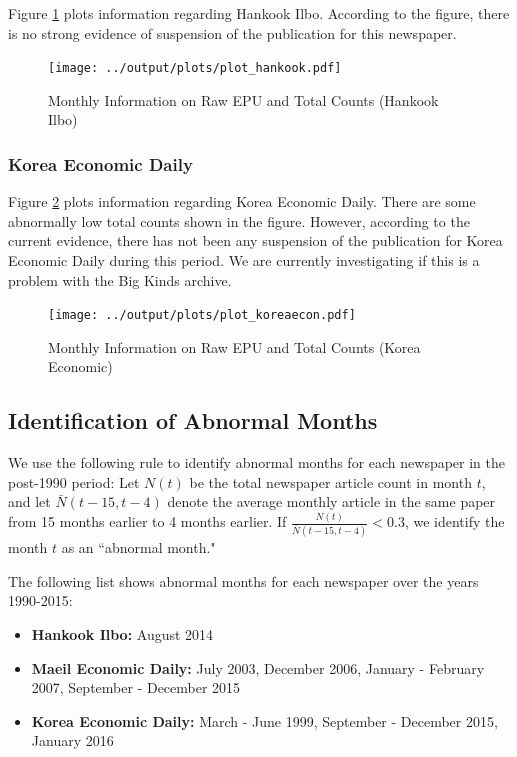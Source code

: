 Figure \ref{fig:hankook} plots information regarding Hankook Ilbo. According to the figure, there is no strong evidence of suspension of the publication for this newspaper. 

\begin{landscape}
\begin{figure}[H] \caption{Monthly Information on Raw EPU and Total Counts (Hankook Ilbo)} \label{fig:hankook}
\begin{center}
\texttt{[image: ../output/plots/plot\_hankook.pdf]} 
\end{center}
\end{figure}
\end{landscape}


\subsubsection{Korea Economic Daily}

Figure \ref{fig:koreaecon} plots information regarding Korea Economic Daily. There are some abnormally low total counts shown in the figure. However, according to the current evidence, there has not been any suspension of the publication for Korea Economic Daily during this period. We are currently investigating if this is a problem with the Big Kinds archive. 

\begin{landscape}
\begin{figure}[H] \caption{Monthly Information on Raw EPU and Total Counts (Korea Economic)} \label{fig:koreaecon}
\begin{center}
\texttt{[image: ../output/plots/plot\_koreaecon.pdf]} 
\end{center}
\end{figure}
\end{landscape}

\subsection{Identification of Abnormal Months} \label{subsec:abnormal}

We use the following rule to identify abnormal months for each newspaper in the post-1990 period: Let $N(t)$ be the total newspaper article count in month $t$, and let $\bar{N}(t-15, t-4)$ denote the average monthly article in the same paper from 15 months earlier to 4 months earlier. If $\frac{N(t)}{\bar{N}(t-15,t-4)} < 0.3$, we identify the month $t$ as an ``abnormal month." 

The following list shows abnormal months for each newspaper over the years 1990-2015:
\begin{itemize}
\item \textbf{Hankook Ilbo:} August 2014
\item \textbf{Maeil Economic Daily:} July 2003, December 2006, January - February 2007, September - December 2015
\item \textbf{Korea Economic Daily:} March - June 1999, September - December 2015, January 2016
\end{itemize}

